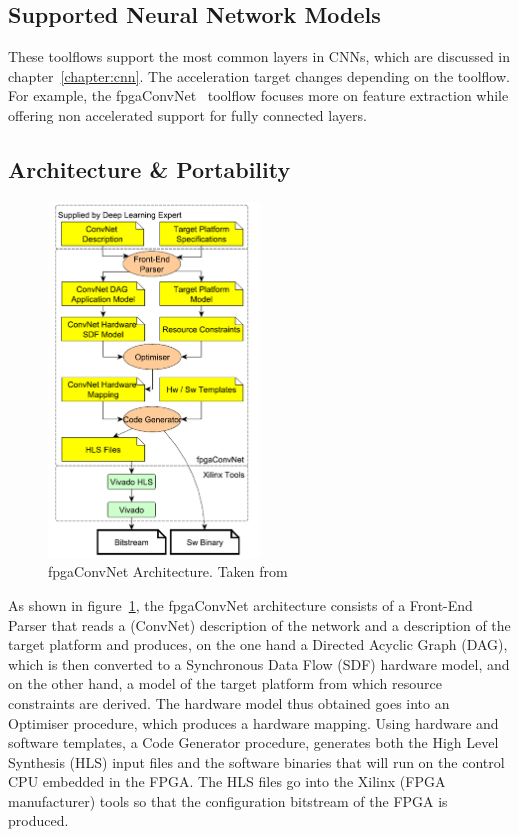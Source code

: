 \subsection{Supported Neural Network Models}

These toolflows support the most common layers in CNNs, which are discussed in
chapter~\ref{chapter:cnn}. The acceleration target changes depending on the
toolflow.  For example, the fpgaConvNet~\cite{fpgaconvnet} toolflow focuses more
on feature extraction while offering non accelerated support for fully connected
layers.

\subsection{Architecture \& Portability}

\begin{figure}[!htbp]
    \centering
    \includegraphics[width=0.5\textwidth]{Figures/fpgaconvnet.png}
    \caption{fpgaConvNet Architecture. Taken from~\cite{fpgaconvnet}}
    \label{figure:fpgaconvnet}
\end{figure}

As shown in figure~\ref{figure:fpgaconvnet}, the fpgaConvNet architecture
consists of a Front-End Parser that reads a (ConvNet) description of the network
and a description of the target platform and produces, on the one hand a
Directed Acyclic Graph (DAG), which is then converted to a Synchronous Data Flow
(SDF) hardware model, and on the other hand, a model of the target platform from
which resource constraints are derived. The hardware model thus obtained goes
into an Optimiser procedure, which produces a hardware mapping. Using hardware
and software templates, a Code Generator procedure, generates both the High
Level Synthesis (HLS) input files and the software binaries that will run on the
control CPU embedded in the FPGA. The HLS files go into the Xilinx (FPGA
manufacturer) tools so that the configuration bitstream of the FPGA is produced.

